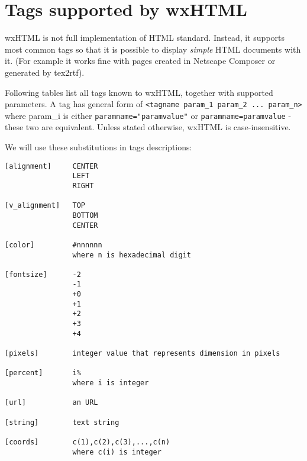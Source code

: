 \section{Tags supported by wxHTML}\label{htmltagssupported}

wxHTML is not full implementation of HTML standard. Instead, it supports most common tags so that it 
is possible to display {\it simple} HTML documents with it. (For example it works fine with pages created
in Netscape Composer or generated by tex2rtf).

Following tables list all tags known to wxHTML, together with supported parameters.
A tag has general form of {\tt <tagname param\_1 param\_2 ... param\_n>} where param\_i is
either {\tt paramname="paramvalue"} or {\tt paramname=paramvalue} - these two are equivalent. Unless stated 
otherwise, wxHTML is case-insensitive.



We will use these substitutions in tags descriptions:

\begin{verbatim}
[alignment]     CENTER
                LEFT
                RIGHT

[v_alignment]   TOP
                BOTTOM
                CENTER
                
[color]         #nnnnnn
                where n is hexadecimal digit

[fontsize]      -2
                -1
                +0
                +1
                +2
                +3
                +4

[pixels]        integer value that represents dimension in pixels

[percent]       i% 
                where i is integer

[url]           an URL 

[string]        text string

[coords]        c(1),c(2),c(3),...,c(n)
                where c(i) is integer

\end{verbatim}



